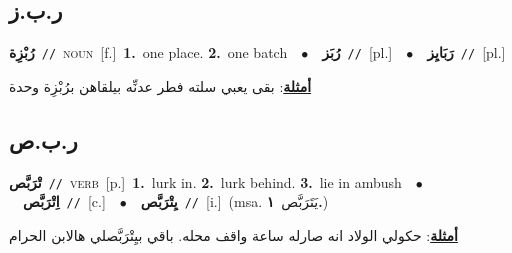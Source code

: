 \documentclass[10pt,a4paper,twoside]{article} %
\begin{document}
\begin{multicols}{2}
\vspace{-3mm}
\subsection*{\color{blue}\foreignlanguage{arabic}{ر.ب.ز}\color{blue}{}} 

{\setlength\topsep{0pt}\textbf{\foreignlanguage{arabic}{رُبْزِة}}\ {\color{gray}\texttt{//}\color{black}}\ \textsc{noun}\ [f.]\ \textbf{1.}~one place.  \textbf{2.}~one batch\ \ $\bullet$\ \ \setlength\topsep{0pt}\textbf{\foreignlanguage{arabic}{رُبَز}}\ {\color{gray}\texttt{//}\color{black}}\ [pl.]\ \ $\bullet$\ \ \setlength\topsep{0pt}\textbf{\foreignlanguage{arabic}{رَبَايِز}}\ {\color{gray}\texttt{//}\color{black}}\ [pl.]\  \begin{flushright}\color{gray}\foreignlanguage{arabic}{\textbf{\underline{\foreignlanguage{arabic}{أمثلة}}}: بقى يعبي سلته فطر عدنِّه بيلقاهن برُبْزِة وحدة}\end{flushright}\color{black}} \vspace{2mm}

\vspace{-3mm}
\subsection*{\color{blue}\foreignlanguage{arabic}{ر.ب.ص}\color{blue}{}} 

{\setlength\topsep{0pt}\textbf{\foreignlanguage{arabic}{تْرَبَّص}}\ {\color{gray}\texttt{//}\color{black}}\ \textsc{verb}\ [p.]\ \textbf{1.}~lurk in.  \textbf{2.}~lurk behind.  \textbf{3.}~lie in ambush\ \ $\bullet$\ \ \setlength\topsep{0pt}\textbf{\foreignlanguage{arabic}{اِتْرَبَّص}}\ {\color{gray}\texttt{//}\color{black}}\ [c.]\ \ $\bullet$\ \ \setlength\topsep{0pt}\textbf{\foreignlanguage{arabic}{يِتْرَبَّص}}\ {\color{gray}\texttt{//}\color{black}}\ [i.]\ \color{gray}(msa. \foreignlanguage{arabic}{يَتَرَبَّص}~\foreignlanguage{arabic}{\textbf{١.}})\color{black}\  \begin{flushright}\color{gray}\foreignlanguage{arabic}{\textbf{\underline{\foreignlanguage{arabic}{أمثلة}}}: حكولي الولاد انه صارله ساعة واقف محله. باقي بيِتْرَبَّصلي هالابن الحرام}\end{flushright}\color{black}} \vspace{2mm}


\end{multicols}
\end{document}
